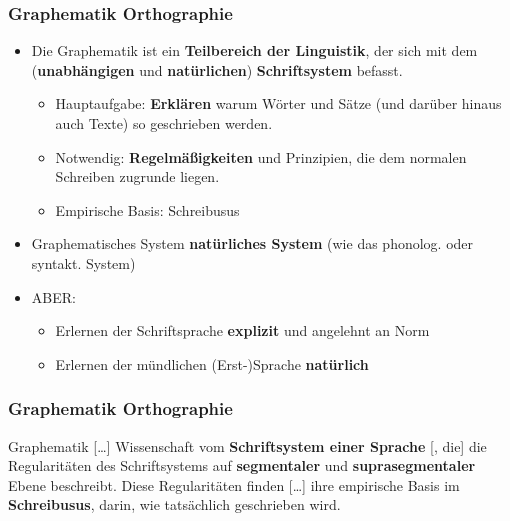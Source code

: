 \begin{frame}
\frametitle{Graphematik \vs Orthographie}

	\begin{itemize}
		\item Die Graphematik ist ein \textbf{Teilbereich der Linguistik}, der sich mit dem (\textbf{unabhängigen} und \textbf{natürlichen}) \textbf{Schriftsystem} befasst.
		
		\begin{itemize}
			\item Hauptaufgabe: \textbf{Erklären} \ras warum Wörter und Sätze (und darüber hinaus auch Texte) so geschrieben werden.
			\item Notwendig: \textbf{Regelmäßigkeiten} und Prinzipien, die dem normalen Schreiben zugrunde liegen.
			\item Empirische Basis: Schreibusus
		\end{itemize}
			
		\item Graphematisches System \ras \textbf{natürliches System} (wie das phonolog. oder syntakt. System)
		\item ABER:
		
		\begin{itemize}
			\item Erlernen der Schriftsprache \ras \textbf{explizit} und angelehnt an Norm
			\item Erlernen der mündlichen (Erst-)Sprache \ras \textbf{natürlich}	
		\end{itemize}
	\end{itemize}
\end{frame}


\begin{frame}
\frametitle{Graphematik \vs Orthographie}

\begin{block}{Graphematik}
	[\ldots] Wissenschaft vom \textbf{Schriftsystem einer Sprache} [, die] die Regularitäten des Schriftsystems auf \textbf{segmentaler} und \textbf{suprasegmentaler} Ebene beschreibt. Diese Regularitäten finden [\ldots] ihre empirische Basis im \textbf{Schreibusus}, \dash darin, wie tatsächlich geschrieben wird. \citep[vgl.][140]{Duerscheid04a}
\end{block}

\end{frame}


